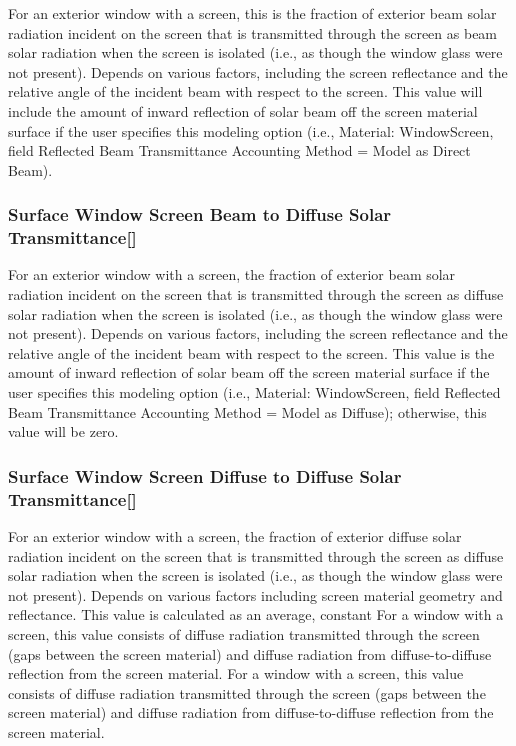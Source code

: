 For an exterior window with a screen, this is the fraction of exterior beam solar radiation incident on the screen that is transmitted through the screen as beam solar radiation when the screen is isolated (i.e., as though the window glass were not present). Depends on various factors, including the screen reflectance and the relative angle of the incident beam with respect to the screen. This value will include the amount of inward reflection of solar beam off the screen material surface if the user specifies this modeling option (i.e., Material: WindowScreen, field Reflected Beam Transmittance Accounting Method = Model as Direct Beam).

\subsubsection{Surface Window Screen Beam to Diffuse Solar Transmittance{[]}}\label{surface-window-screen-beam-to-diffuse-solar-transmittance}

For an exterior window with a screen, the fraction of exterior beam solar radiation incident on the screen that is transmitted through the screen as diffuse solar radiation when the screen is isolated (i.e., as though the window glass were not present). Depends on various factors, including the screen reflectance and the relative angle of the incident beam with respect to the screen. This value is the amount of inward reflection of solar beam off the screen material surface if the user specifies this modeling option (i.e., Material: WindowScreen, field Reflected Beam Transmittance Accounting Method = Model as Diffuse); otherwise, this value will be zero.

\subsubsection{Surface Window Screen Diffuse to Diffuse Solar Transmittance{[]}}\label{surface-window-screen-diffuse-to-diffuse-solar-transmittance}

For an exterior window with a screen, the fraction of exterior diffuse solar radiation incident on the screen that is transmitted through the screen as diffuse solar radiation when the screen is isolated (i.e., as though the window glass were not present). Depends on various factors including screen material geometry and reflectance. This value is calculated as an average, constant For a window with a screen, this value consists of diffuse radiation transmitted through the screen (gaps between the screen material) and diffuse radiation from diffuse-to-diffuse reflection from the screen material. For a window with a screen, this value consists of diffuse radiation transmitted through the screen (gaps between the screen material) and diffuse radiation from diffuse-to-diffuse reflection from the screen material.

